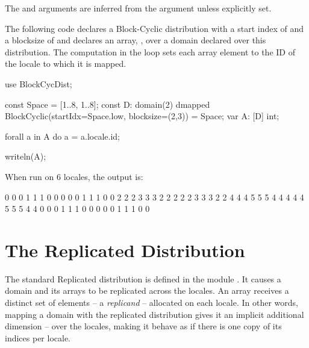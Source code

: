 
The  and  arguments are inferred from the
 argument unless explicitly set.

\begin{example}
The following code declares a Block-Cyclic distribution with a start index
of  and a blocksize of  and declares an array, , over a domain
declared over this distribution.  The computation in the 
loop sets each array element to the ID of the locale to which it is
mapped.
\begin{chapel}
use BlockCycDist;

const Space = [1..8, 1..8];
const D: domain(2) dmapped BlockCyclic(startIdx=Space.low, 
                                       blocksize=(2,3)) 
       = Space;
var A: [D] int;

forall a in A do
  a = a.locale.id;

writeln(A);
\end{chapel}
When run on 6 locales, the output is:
\begin{chapel}
0 0 0 1 1 1 0 0
0 0 0 1 1 1 0 0
2 2 2 3 3 3 2 2
2 2 2 3 3 3 2 2
4 4 4 5 5 5 4 4
4 4 4 5 5 5 4 4
0 0 0 1 1 1 0 0
0 0 0 1 1 1 0 0
\end{chapel}
\end{example}


\section{The Replicated Distribution}
\label{Replicated_Dist}

The standard Replicated distribution is defined in the module
.
It causes a domain and its arrays to be replicated across the locales.
An array receives a distinct set of elements -- a \emph{replicand} --
allocated on each locale.
%
In other words, mapping a domain with the replicated distribution gives it
an implicit additional dimension -- over the locales,
making it behave as if there is one copy of its indices per locale.

